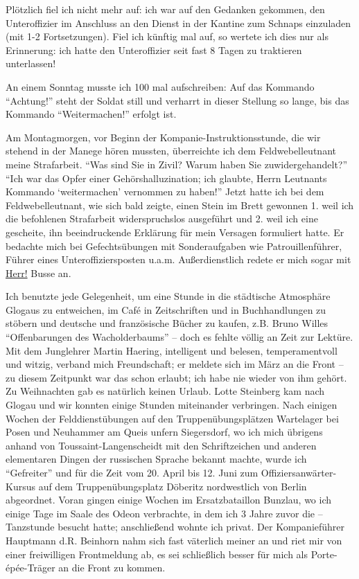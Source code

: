 Plötzlich fiel ich nicht mehr auf: ich war auf den Gedanken gekommen, den Unteroffizier im Anschluss an den Dienst in der Kantine zum Schnaps einzuladen (mit 1-2 Fortsetzungen). Fiel ich künftig mal auf, so wertete ich dies nur als Erinnerung: ich hatte den Unteroffizier seit fast 8 Tagen zu traktieren unterlassen!

An einem Sonntag musste ich 100 mal aufschreiben: Auf das Kommando \enquote{Achtung!} steht der Soldat still und verharrt in dieser Stellung so lange, bis das Kommando \enquote{Weitermachen!} erfolgt ist.

Am Montagmorgen, vor Beginn der Kompanie-Instruktionsstunde, die wir stehend in der Manege hören mussten, überreichte ich dem Feldwebelleutnant meine Strafarbeit. \enquote{Was sind Sie in Zivil? Warum haben Sie zuwidergehandelt?} \enquote{Ich war das Opfer einer Gehörshalluzination; ich glaubte, Herrn Leutnants Kommando \enquote{weitermachen} vernommen zu haben!} Jetzt hatte ich bei dem Feldwebelleutnant, wie sich bald zeigte, einen Stein im Brett gewonnen 1. weil ich die befohlenen Strafarbeit widerspruchslos ausgeführt und 2. weil ich eine gescheite, ihn beeindruckende Erklärung für mein Versagen formuliert hatte. Er bedachte mich bei Gefechtsübungen mit Sonderaufgaben wie Patrouillenführer, Führer eines Unteroffiziersposten u.a.m. Außerdienstlich redete er mich sogar mit \underline{Herr!} Busse an.

Ich benutzte jede Gelegenheit, um eine Stunde in die städtische Atmosphäre Glogaus zu entweichen, im Café in Zeitschriften und in Buchhandlungen zu stöbern und deutsche und französische Bücher zu kaufen, z.B. Bruno Willes \enquote{Offenbarungen des Wacholderbaums} -- doch es fehlte völlig an Zeit zur Lektüre. Mit dem Junglehrer Martin Haering, intelligent und belesen, temperamentvoll und witzig, verband mich Freundschaft; er meldete sich im März an die Front -- zu diesem Zeitpunkt war das schon erlaubt; ich habe nie wieder von ihm gehört. Zu Weihnachten gab es natürlich keinen Urlaub. Lotte Steinberg kam nach Glogau und wir konnten einige Stunden miteinander verbringen. Nach einigen Wochen der Felddienstübungen auf den Truppenübungsplätzen Wartelager bei Posen und Neuhammer am Queis unfern Siegersdorf, wo ich mich übrigens anhand von Toussaint-Langenscheidt mit den Schriftzeichen und anderen elementaren Dingen der russischen Sprache bekannt machte, wurde ich \enquote{Gefreiter} und für die Zeit vom 20. April bis 12. Juni zum Offiziersanwärter-Kursus auf dem Truppenübungsplatz Döberitz nordwestlich von Berlin abgeordnet. Voran gingen einige Wochen im Ersatzbataillon Bunzlau, wo ich einige Tage im Saale des Odeon verbrachte, in dem ich 3 Jahre zuvor die -- Tanzstunde besucht hatte; anschließend wohnte ich privat. Der Kompanieführer Hauptmann d.R. Beinhorn nahm sich fast väterlich meiner an und riet mir von einer freiwilligen Frontmeldung ab, es sei schließlich besser für mich als Porte-épée-Träger an die Front zu kommen.

